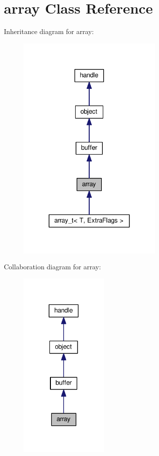 \hypertarget{classarray}{}\section{array Class Reference}
\label{classarray}


Inheritance diagram for array\+:
\nopagebreak
\begin{figure}[H]
\begin{center}
\leavevmode
\includegraphics[width=204pt]{classarray__inherit__graph}
\end{center}
\end{figure}


Collaboration diagram for array\+:
\nopagebreak
\begin{figure}[H]
\begin{center}
\leavevmode
\includegraphics[width=125pt]{classarray__coll__graph}
\end{center}
\end{figure}
